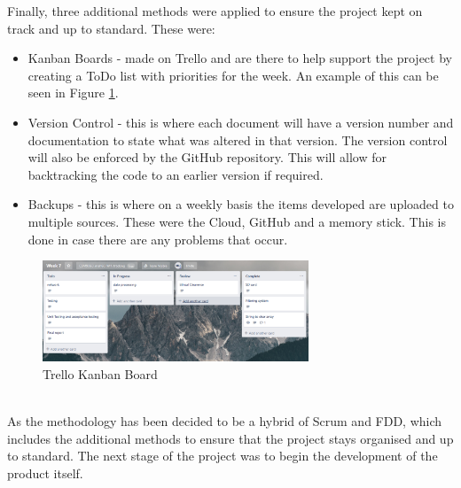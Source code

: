 \documentclass{report}
\begin{document}
Finally, three additional methods were applied to ensure the project kept on track and up to standard. These were:
\begin{itemize}
   \item Kanban Boards - made on Trello\cite{Trello} and are there to help support the project by creating a ToDo list with priorities for the week. An example of this can be seen in Figure \ref{fig:kanban board}.
    \item Version Control - this is where each document will have a version number and documentation to state what was altered in that version. The version control will also be enforced by the GitHub repository\cite{Github}. This will allow for backtracking the code to an earlier version if required.
    \item Backups - this is where on a weekly basis the items developed are uploaded to multiple sources. These were the Cloud, GitHub and a memory stick. This is done in case there are any problems that occur.
\end{itemize}
   \begin{figure}[h!]
    \centering
    \includegraphics[width=300]{kanban_board.PNG} 
    \caption{Trello Kanban Board\cite{Trello}}
    \label{fig:kanban board}
    \end{figure} \\ 
As the methodology has been decided to be a hybrid of Scrum and FDD, which includes the additional methods to ensure that the project stays organised and up to standard. The next stage of the project was to begin the development of the product itself. 
\clearpage
\end{document}
